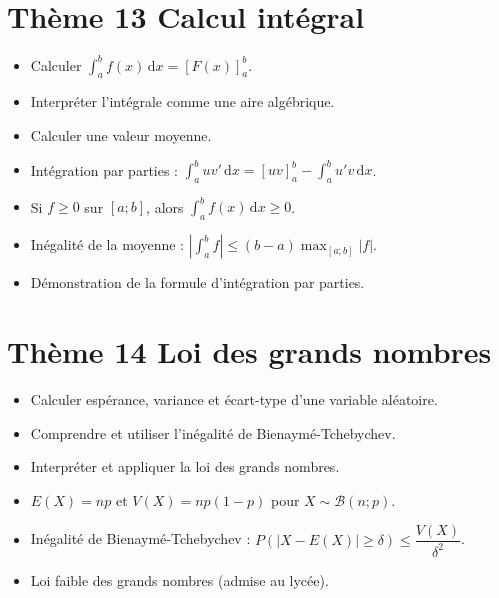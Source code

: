 \documentclass[11pt,a4paper,openany]{book}
\theoremstyle{definition}
\begin{document}
    \section*{Thème 13 \textemdash{} Calcul intégral}
    \begin{capacitesbox}
    \begin{itemize}
        \item Calculer $\displaystyle\int_a^b f(x)\,\mathrm{d}x=[F(x)]_a^b$.
        \item Interpréter l'intégrale comme une aire algébrique.
        \item Calculer une valeur moyenne.
        \item Intégration par parties :
              $\displaystyle\int_a^b uv'\,\mathrm{d}x=[uv]_a^b
              -\int_a^b u'v\,\mathrm{d}x$.
    \end{itemize}
    \end{capacitesbox}
    \begin{demoprogbox}
    \begin{itemize}
        \item Si $f\geq 0$ sur $[a;b]$, alors
              $\displaystyle\int_a^b f(x)\,\mathrm{d}x\geq 0$.
        \item Inégalité de la moyenne :
              $\left|\displaystyle\int_a^b f\right|\leq(b-a)
              \displaystyle\max_{[a;b]}|f|$.
        \item Démonstration de la formule d'intégration par parties.
    \end{itemize}
    \end{demoprogbox}

    \section*{Thème 14 \textemdash{} Loi des grands nombres}
    \begin{capacitesbox}
    \begin{itemize}
        \item Calculer espérance, variance et écart-type d'une variable
              aléatoire.
        \item Comprendre et utiliser l'inégalité de Bienaymé-Tchebychev.
        \item Interpréter et appliquer la loi des grands nombres.
    \end{itemize}
    \end{capacitesbox}
    \begin{demoprogbox}
    \begin{itemize}
        \item $E(X)=np$ et $V(X)=np(1-p)$ pour $X\sim\mathcal{B}(n;p)$.
        \item Inégalité de Bienaymé-Tchebychev :
              $P(|X-E(X)|\geq\delta)\leq\dfrac{V(X)}{\delta^2}$.
        \item Loi faible des grands nombres (admise au lycée).
    \end{itemize}
    \end{demoprogbox}
\end{document}
